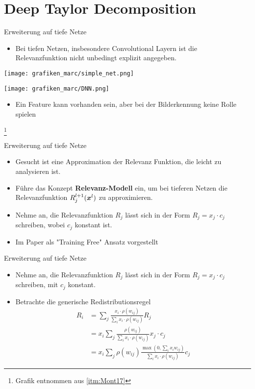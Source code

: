 \section{Deep Taylor Decomposition}
\frame{\sectionpage}
\begin{frame}{Erweiterung auf tiefe Netze}
\begin{itemize}
\item Bei tiefen Netzen, insbesondere Convolutional Layern ist die Relevanzfunktion nicht unbedingt explizit angegeben.
\end{itemize}
\vspace*{20pt}
\begin{minipage}{0.42\textwidth}
\texttt{[image: grafiken\_marc/simple\_net.png]}
\end{minipage}
\begin{minipage}{0.52\textwidth}
\texttt{[image: grafiken\_marc/DNN.png]}
\end{minipage}
\vspace*{10pt}
\begin{itemize}
\item Ein Feature kann vorhanden sein, aber bei der Bilderkennung keine Rolle spielen
\end{itemize}
\footnote{Grafik entnommen aus \ref{itm:Mont17}}
\end{frame}

\begin{frame}{Erweiterung auf tiefe Netze}
\begin{itemize}
\item Gesucht ist eine Approximation der Relevanz Funktion, die leicht zu analysieren ist.
\item Führe das Konzept \textbf{Relevanz-Modell} ein, um bei tieferen Netzen die Relevanzfunktion $R_j^{l+1}(\boldsymbol{x}^{l})$ zu approximieren.
\item Nehme an, die Relevanzfunktion $R_j$ lässt sich in der Form $R_j = x_j \cdot c_j$ schreiben, wobei $c_j$ konstant ist.
\item Im Paper als "{}Training Free"{} Ansatz vorgestellt
\end{itemize}
\end{frame}

\begin{frame}{Erweiterung auf tiefe Netze}
\begin{itemize}
\item Nehme an, die Relevanzfunktion $R_j$ lässt sich in der Form $R_j = x_j \cdot c_j$ schreiben, mit $c_j$ konstant.
\item Betrachte die generische Redistributionsregel
\begin{align*}
R_i &= \sum_{j} \frac{x_{i} \cdot \rho(w_{i j})}{\sum_{i} x_{i} \cdot \rho(w_{i j})} R_{j}\\
& = x_{i} \sum_{j}  \frac{ \rho(w_{i j})}{\sum_{i} x_{i} \cdot \rho(w_{i j})} x_j \cdot c_j \\
&= x_i \sum_{j}   \rho(w_{i j}) \frac{\max \left(0, \sum_{i} x_{i} w_{i j}\right)}{\sum_{i} x_{i} \cdot \rho(w_{i j})} c_j
\end{align*}
\end{itemize}
\end{frame}

